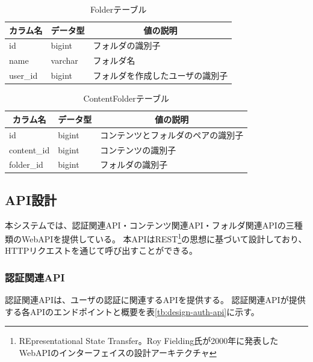 \begin{table}[htbp]
  \label{tb:design-folder-table}
  \caption{Folderテーブル}
  \begin{center}
    \begin{tabular}{|l|l|l|}
      \hline
      \multicolumn{1}{|c|}{\textbf{カラム名}} & \multicolumn{1}{|c|}{\textbf{データ型}} & \multicolumn{1}{|c|}{\textbf{値の説明}} \\\hline
      id & bigint & フォルダの識別子 \\\hline
      name & varchar & フォルダ名 \\\hline
      user\_id & bigint & フォルダを作成したユーザの識別子 \\\hline
    \end{tabular}
  \end{center}
\end{table}

\begin{table}[htbp]
  \label{tb:design-content-folder-table}
  \caption{ContentFolderテーブル}
  \begin{center}
    \begin{tabular}{|l|l|l|}
      \hline
      \multicolumn{1}{|c|}{\textbf{カラム名}} & \multicolumn{1}{|c|}{\textbf{データ型}} & \multicolumn{1}{|c|}{\textbf{値の説明}} \\\hline
      id & bigint & コンテンツとフォルダのペアの識別子 \\\hline
      content\_id & bigint & コンテンツの識別子 \\\hline
      folder\_id & bigint & フォルダの識別子 \\\hline
    \end{tabular}
  \end{center}
\end{table}

\subsection{API設計}
本システムでは、認証関連API・コンテンツ関連API・フォルダ関連APIの三種類のWebAPIを提供している。
本APIはREST\footnote{REpresentational State Transfer。Roy Fielding氏が2000年に発表したWebAPIのインターフェイスの設計アーキテクチャ}の思想に基づいて設計しており、HTTPリクエストを通じて呼び出すことができる。

\subsubsection{認証関連API}
認証関連APIは、ユーザの認証に関連するAPIを提供する。
認証関連APIが提供する各APIのエンドポイントと概要を表\ref{tb:design-auth-api}に示す。

